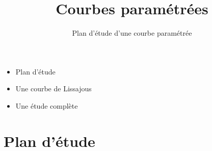 

  





\title{{\bf Courbes paramétrées}}
\subtitle{Plan d'étude d'une courbe paramétrée}

\begin{frame}
  
  \debutmontitre

  \pause

{\footnotesize
\hfill
{}
\begin{minipage}{0.6\textwidth}
  \begin{itemize}
    \item<3-> Plan d'étude
    \item<4-> Une courbe de Lissajous
    \item<5-> Une étude complète
  \end{itemize}
\end{minipage}
}

\end{frame}

\setcounter{framenumber}{0}



\section{Plan d'étude}

